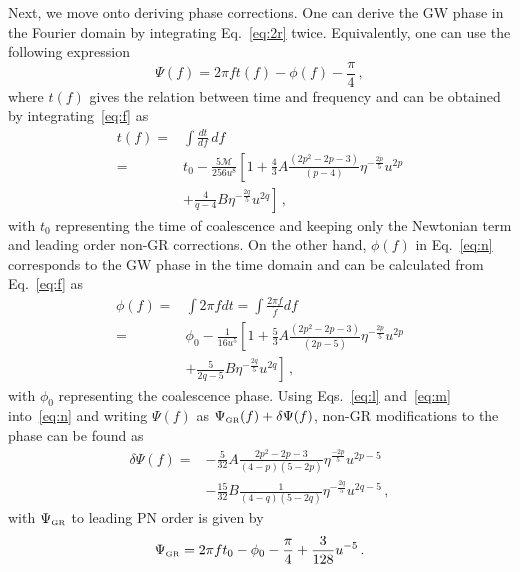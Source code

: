 \documentclass[prd,twocolumn,nofootinbib]{revtex4-1}
\newcommand{\GR}{{\mbox{\tiny GR}}}
\begin{document}
Next, we move onto deriving phase corrections. One can derive the GW phase in the Fourier domain by integrating Eq.~\eqref{eq:2r} twice. Equivalently, one can use the following expression
\begin{equation}\label{eq:n}
\Psi(f)=2\pi f t(f)-\phi(f)-\frac{\pi}{4}\,,
\end{equation}
where $t(f)$ gives the relation between time and frequency and can be obtained by integrating~\eqref{eq:f} as
\begin{align}\label{eq:l}
t(f)=&\int \frac{dt}{df} \, df\nonumber\\=&t_0 -\frac{5 \mathcal{M}}{256 u^8}\left[1+\frac{4}{3}A\frac{\left(2 p^2-2 p-3\right)}{(p-4)}\eta ^{-\frac{2 p}{5}} u^{2 p}\right.\nonumber\\ &\left. +\frac{4}{q-4}B\eta ^{-\frac{2q}{5}} u^{2q}\right]\,,
\end{align}
with $t_0$ representing the time of coalescence and keeping only the Newtonian term and leading order non-GR corrections. On the other hand, $\phi(f)$ in Eq.~\eqref{eq:n} corresponds to the GW phase in the time domain and can be calculated from Eq.~\eqref{eq:f} as
\begin{align}\label{eq:m}
\phi(f)=&\int 2 \pi f dt=\int\frac{2\pi f}{\dot{f}}df\nonumber\\
=&\phi_0 -\frac{1}{16 u^5}\left[1+\frac{5}{3}A\frac{\left(2 p^2-2 p-3\right)}{(2 p-5)} \eta ^{-\frac{2 p}{5}} u^{2 p}\right. \nonumber \\
& \left. +\frac{5}{2 q-5}B\eta ^{-\frac{2 q}{5}} u^{2 q}\right]\,,
\end{align}
with $\phi_0$ representing the coalescence phase. Using Eqs.~\eqref{eq:l} and~\eqref{eq:m} into~\eqref{eq:n} and writing $\Psi(f)$ as $\Psi_{\GR}(f)+\delta\Psi(f)$, non-GR modifications to the phase can be found as
 \begin{align}\label{eq:p2}
\delta\Psi(f)=&-\frac{5}{32}A\frac{2p^2-2p-3}{(4-p)(5-2p)}\eta^{\frac{-2p}{5}}u^{2p-5}\nonumber\\ &-\frac{15}{32}B\frac{1}{(4-q)(5-2q)}\eta^{-\frac{2q}{5}}u^{2q-5}\,,
 \end{align}
with $\Psi_{\GR}$ to leading PN order is given by \cite{Blanchet:1995ez}
\begin{equation}
\label{eq:Psi_GR}
\Psi_{\GR}=2\pi f t_0-\phi_0-\frac{\pi}{4}+\frac{3}{128}u^{-5}\,.
\end{equation}
\end{document}
